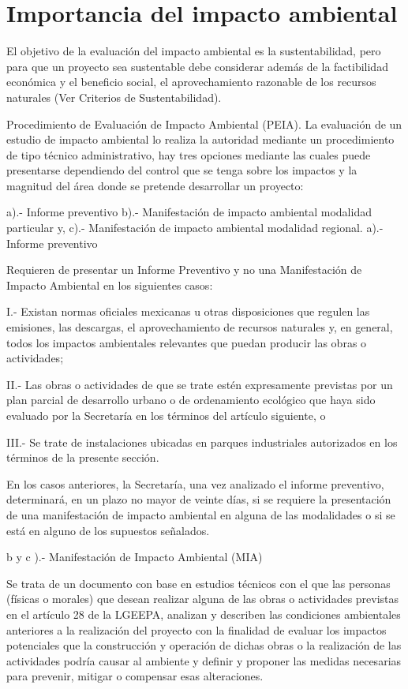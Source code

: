 \chapter{Importancia del impacto ambiental}


El objetivo de la evaluación del impacto ambiental es la sustentabilidad, pero para que un proyecto sea sustentable debe considerar además de la factibilidad económica y el beneficio social, el aprovechamiento razonable de los recursos naturales (Ver Criterios de Sustentabilidad).

Procedimiento de Evaluación de Impacto Ambiental (PEIA).
La evaluación de un estudio de impacto ambiental lo realiza la autoridad mediante un procedimiento de tipo técnico administrativo,  hay tres opciones mediante las cuales puede presentarse dependiendo del control que se tenga sobre los impactos y la magnitud del área donde se pretende desarrollar un proyecto:  

 a).-	 Informe preventivo
 b).-	 Manifestación de impacto ambiental modalidad particular y,
 c).-	 Manifestación de impacto ambiental modalidad regional.
a).- Informe preventivo

Requieren de presentar un Informe Preventivo y no una Manifestación de Impacto Ambiental en los siguientes casos:  

I.- Existan normas oficiales mexicanas u otras disposiciones que regulen las emisiones, las descargas, el aprovechamiento de recursos naturales y, en general, todos los impactos ambientales relevantes que puedan producir las obras o actividades;

II.- Las obras o actividades de que se trate estén expresamente previstas por un plan parcial de desarrollo urbano o de ordenamiento ecológico que haya sido evaluado por la Secretaría en los términos del artículo siguiente, o 

III.- Se trate de instalaciones ubicadas en parques industriales autorizados en los términos de la presente sección.

En los casos anteriores, la Secretaría, una vez analizado el informe preventivo, determinará, en un plazo no mayor de veinte días, si se requiere la presentación de una manifestación de impacto ambiental en alguna de las modalidades o si se está en alguno de los supuestos señalados.

b y c ).- Manifestación de Impacto Ambiental (MIA)

Se trata de un documento con base en estudios técnicos con el que las personas (físicas o morales) que desean realizar alguna de las obras o actividades previstas en el artículo 28 de la  LGEEPA, analizan y describen las condiciones ambientales anteriores a la realización del proyecto con la finalidad de evaluar  los impactos potenciales que la construcción y operación de dichas obras o la realización de las actividades podría causar al ambiente  y definir y proponer las medidas necesarias para prevenir, mitigar o compensar esas alteraciones.


